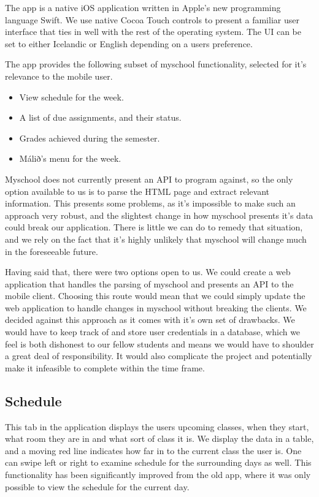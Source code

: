 \documentclass[pdftex, DIV=calc, paper=a4, fontsize=11pt, twocolumn]{scrartcl}	 %
\begin{document}
The app is a native iOS application written in Apple's new programming language Swift.
We use native Cocoa Touch controls to present a familiar user interface that ties in well with
the rest of the operating system. The UI can be set to either Icelandic or English depending on a 
users preference.

The app provides the following subset of myschool functionality, selected for it's relevance to
the mobile user.

\begin{itemize}
    \item View schedule for the week.
    \item A list of due assignments, and their status.
    \item Grades achieved during the semester.
    \item Málið's menu for the week.
\end{itemize}


Myschool does not currently present an API to program against, so the only option available to us
is to parse the HTML page and extract relevant information. This presents some problems, as it's 
impossible to make such an approach very robust, and the slightest change in how myschool presents
it's data could break our application. There is little we can do to remedy that situation, and we
rely on the fact that it's highly unlikely that myschool will change much in the foreseeable future.

Having said that, there were two options open to us. We could create a web application that handles
the parsing of myschool and presents an API to the mobile client. Choosing this route would mean that
we could simply update the web application to handle changes in myschool without breaking the 
clients. We decided against this approach as it comes with it's own set of drawbacks. We would have
to keep track of and store user credentials in a database, which we feel is both dishonest to our
fellow students and means we would have to shoulder a great deal of responsibility. It would also 
complicate the project and potentially make it infeasible to complete within the time frame.

\subsection*{Schedule}

This tab in the application displays the users upcoming classes, when they start, what room they
are in and what sort of class it is. We display the data in a table, and a moving red line indicates
how far in to the current class the user is. One can swipe left or right to examine schedule for
the surrounding days as well. This functionality has been significantly improved from the old app,
where it was only possible to view the schedule for the current day.
\end{document}

